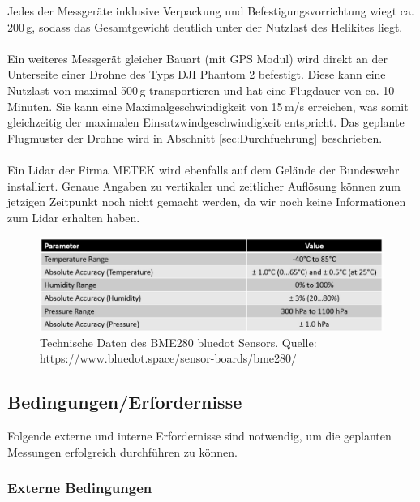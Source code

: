 \documentclass[a4paper,11pt,DIV=calc,tablecaptionabove,headinclude,twoside]{article}
\begin{document}
Jedes der Messgeräte inklusive Verpackung und Befestigungsvorrichtung wiegt ca. 200\,g, sodass das Gesamtgewicht deutlich unter der Nutzlast des Helikites liegt.\\\\
Ein weiteres Messgerät gleicher Bauart (mit GPS Modul) wird direkt an der Unterseite einer Drohne des Typs DJI Phantom 2 befestigt. Diese kann eine Nutzlast von maximal 500\,g transportieren und hat eine Flugdauer von ca. 10 Minuten. Sie kann eine Maximalgeschwindigkeit von 15\,m/s erreichen, was somit gleichzeitig der maximalen Einsatzwindgeschwindigkeit entspricht. Das geplante Flugmuster der Drohne wird in Abschnitt \ref{sec:Durchfuehrung} beschrieben. \\\\
Ein Lidar der Firma METEK wird ebenfalls auf dem Gelände der Bundeswehr installiert. Genaue Angaben zu vertikaler und zeitlicher Auflösung können zum jetzigen Zeitpunkt noch nicht gemacht werden, da wir noch keine Informationen zum Lidar erhalten haben.  
\begin{figure}[b!]
\centering
\includegraphics[width=\textwidth]{BME_280_technische_Daten.png}
\captionsetup{width=11cm}
\caption{Technische Daten des BME280 bluedot Sensors. Quelle: https://www.bluedot.space/sensor-boards/bme280/}
\label{BME_280}
\end{figure}

\subsection{Bedingungen/Erfordernisse}
\label{Bedingungen}

Folgende externe und interne Erfordernisse sind notwendig, um die geplanten Messungen erfolgreich durchführen zu können.

\subsubsection{Externe Bedingungen}
\end{document}
